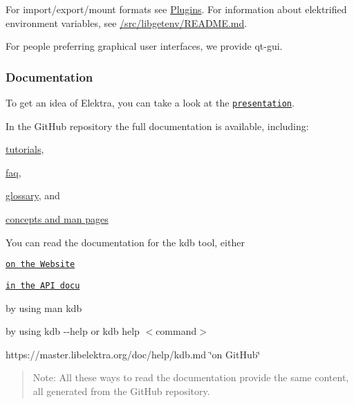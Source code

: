 \href{https://asciinema.org/a/cantr04assr4jkv8v34uz9b8r}{\tt }

For import/export/mount formats see \hyperlink{md_src_plugins_README_src_plugins_README_md}{Plugins}. For information about elektrified environment variables, see \hyperlink{src_libs_getenv_README_md}{/src/libgetenv/\+R\+E\+A\+D\+ME.md}.

For people preferring graphical user interfaces, we provide qt-\/gui.

\subsubsection*{Documentation}

To get an idea of Elektra, you can take a look at the \href{https://www.libelektra.org/ftp/elektra/presentations/2016/FOSDEM/fosdem.odp}{\tt presentation}.

In the Git\+Hub repository the full documentation is available, including\+:


\begin{DoxyItemize}
\item \hyperlink{md_doc_tutorials_README_doc_tutorials_README_md}{tutorials},
\item \hyperlink{doc_help_elektra-faq_md}{faq},
\item \hyperlink{md_doc_help_elektra-glossary_doc_help_elektra-glossary_md}{glossary}, and
\item \hyperlink{md_doc_help_elektra-introduction_doc_help_elektra-introduction_md}{concepts and man pages}
\end{DoxyItemize}

You can read the documentation for the kdb tool, either


\begin{DoxyItemize}
\item \href{https://www.libelektra.org}{\tt on the Website}
\item \href{https://doc.libelektra.org/api/latest/html/md_doc_help_kdb.html}{\tt in the A\+PI docu}
\item by using {\ttfamily man kdb}
\item by using {\ttfamily kdb -\/-\/help} or {\ttfamily kdb help $<$command$>$}
\item https\+://master.libelektra.\+org/doc/help/kdb.md \char`\"{}on Git\+Hub\char`\"{}
\end{DoxyItemize}

\begin{quote}
Note\+: All these ways to read the documentation provide the same content, all generated from the Git\+Hub repository. \end{quote}


